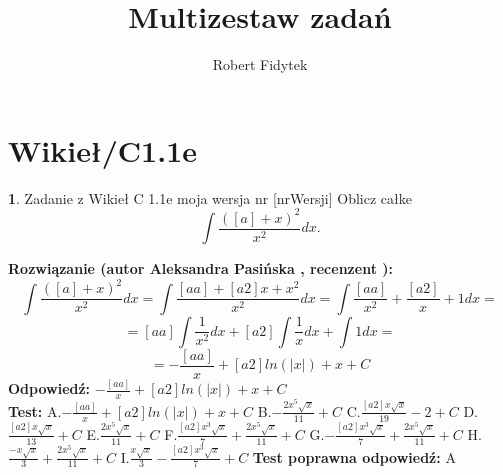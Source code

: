 \documentclass[12pt, a4paper]{article}
\title{Multizestaw zadań}
\author{Robert Fidytek}
\date{}
\theoremstyle{definition} %
\newtheorem{zad}{}
\newcommand{\kategoria}[1]{\section{#1}} %
\newcommand{\zadStart}[1]{\begin{zad}#1\newline} %
\newcommand{\zadStop}{\end{zad}}   %
\newcommand{\rozwStart}[2]{\noindent \textbf{Rozwiązanie (autor #1 , recenzent #2): }\newline} %
\newcommand{\rozwStop}{\newline}                                            %
\newcommand{\odpStart}{\noindent \textbf{Odpowiedź:}\newline}    %
\newcommand{\odpStop}{\newline}                                             %
\newcommand{\testStart}{\noindent \textbf{Test:}\newline} %
\newcommand{\testStop}{\newline} %
\newcommand{\kluczStart}{\noindent \textbf{Test poprawna odpowiedź:}\newline} %
\newcommand{\kluczStop}{\newline} %
\begin{document}
\maketitle


\kategoria{Wikieł/C1.1e}
\zadStart{Zadanie z Wikieł C 1.1e moja wersja nr [nrWersji]}
Oblicz całke $$\int \frac{([a]+x)^2}{x^2}dx.$$
\zadStop
\rozwStart{Aleksandra Pasińska}{}
$$\int \frac{([a]+x)^2}{x^2}dx=\int \frac{[aa]+[a2]x+x^2}{x^2}dx=\int \frac{[aa]}{x^2}+\frac{[a2]}{x}+1dx=$$
$$=[aa]\int\frac{1}{x^2}dx+[a2]\int\frac{1}{x}dx+\int1dx= $$
$$=-\frac{[aa]}{x}+[a2] ln(|x|)+x+C$$
\rozwStop
\odpStart
$-\frac{[aa]}{x}+[a2] ln(|x|)+x+C$\\
\odpStop
\testStart
A.$-\frac{[aa]}{x}+[a2] ln(|x|)+x+C$
B.$-\frac{2x^5\sqrt{x}}{11}+C$
C.$\frac{[a2]x\sqrt{x}}{19}-2+C$
D.$\frac{[a2]x\sqrt{x}}{13}+C$
E.$\frac{2x^5\sqrt{x}}{11}+C$
F.$\frac{[a2]x^3\sqrt{x}}{7}+\frac{2x^5\sqrt{x}}{11}+C$
G.$-\frac{[a2]x^3\sqrt{x}}{7}+\frac{2x^5\sqrt{x}}{11}+C$
H.$\frac{-x\sqrt{x}}{3}+\frac{2x^5\sqrt{x}}{11}+C$
I.$\frac{x\sqrt{x}}{3}-\frac{[a2]x^3\sqrt{x}}{7}+C$
\testStop
\kluczStart
A
\kluczStop
\end{document}
